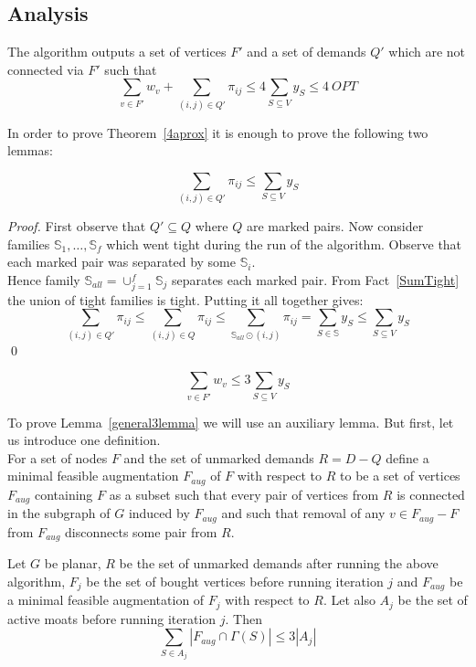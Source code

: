 \subsection{Analysis}
\begin{theorem}
\label{4aprox}
The algorithm outputs a set of vertices $F'$ and a set of demands $Q'$ which are not connected via $F'$ such that
$$\sum_{v\in F'}w_v + \sum_{(i,j)\in Q'}\pi_{ij} \leq 4\sum_{S\subseteq V}y_S \leq 4\ OPT$$
\end{theorem}
In order to prove Theorem~\ref{4aprox} it is enough to prove the following two lemmas:
\begin{lemma}
\label{pc1lemma}
$$\sum_{(i,j)\in Q'}\pi_{ij} \leq \sum_{S\subseteq V}y_S$$
\end{lemma}
\begin{proof}
First observe that $Q' \subseteq Q$ where $Q$ are marked pairs. Now consider families $\mathbb{S}_1,\dots,\mathbb{S}_f$ which went tight during the run of the algorithm. Observe that each marked pair was separated by some $\mathbb{S}_i$.\\
Hence family $\mathbb{S}_{all} = \displaystyle\mathop{\cup}_{j=1}^{f}\mathbb{S}_j$ separates each marked pair.
From Fact~\ref{SumTight} the union of tight families is tight. Putting it all together gives:\\
$$\sum_{(i,j)\in Q'}\pi_{ij} \leq \sum_{(i,j)\in Q}\pi_{ij} \leq \sum_{\mathbb{S}_{all}\odot (i,j)}\pi_{ij} = \sum_{S\in\mathbb{S}}y_S \leq \sum_{S\subseteq V}y_S$$ \qed
\end{proof}

\begin{lemma}
\label{general3lemma}
$$\sum_{v\in F'}w_v \leq 3\sum_{S\subseteq V}y_S$$
\end{lemma}
To prove Lemma~\ref{general3lemma} we will use an auxiliary lemma. But first, let us introduce one definition.\\
For a set of nodes $F$ and the set of unmarked demands $R=D-Q$ define a minimal feasible augmentation $F_{aug}$ of $F$ with respect to $R$ to be a set of vertices $F_{aug}$ containing $F$ as a subset such that every pair of vertices from $R$ is connected in the subgraph of $G$ induced by $F_{aug}$ and such that removal of any $v\in F_{aug} - F$ from $F_{aug}$ disconnects some pair from $R$.

\begin{lemma}
\label{Carsten3lemma}
Let $G$ be planar, $R$ be the set of unmarked demands after running the above algorithm, $F_j$ be the set of bought vertices before running iteration $j$ and $F_{aug}$ be a minimal feasible augmentation of $F_j$ with respect to $R$. Let also $A_j$ be the set of active moats before running iteration $j$. Then\\
$$\sum_{S\in{A_j}}|F_{aug} \cap \Gamma(S)| \leq 3|A_j|$$
\end{lemma}

